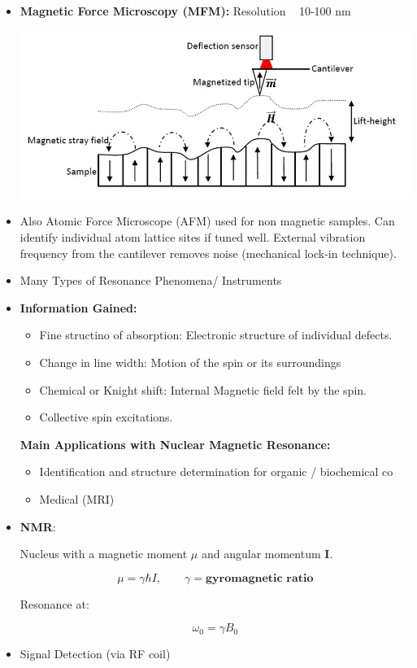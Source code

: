 \begin{itemize}
    \item \textbf{Magnetic Force Microscopy (MFM):} Resolution ~ 10-100 nm
    
    \includegraphics[width = 0.9\linewidth]{Images/MFM.jpeg}
    
    \item Also Atomic Force Microscope (AFM) used for non magnetic samples. Can identify individual atom lattice sites if tuned well. External vibration frequency from the cantilever removes noise (mechanical lock-in technique).
    
    \item Many Types of Resonance Phenomena/ Instruments
    
    \item \textbf{Information Gained:}
    \begin{itemize}
        \item Fine structino of absorption: Electronic structure of individual defects.
        \item Change in line width: Motion of the spin or its surroundings
        \item Chemical or Knight shift: Internal Magnetic field felt by the spin.
        \item Collective spin excitations.
    \end{itemize}
    
    \textbf{Main Applications with Nuclear Magnetic Resonance:} 
    \begin{itemize}
        \item Identification and structure determination for organic / biochemical co
        \item Medical (MRI)
    \end{itemize}
    
    \item \textbf{NMR}:
    
    Nucleus with a magnetic moment \textbf{$\mu$} and angular momentum \textbf{I}.
    
    \[\mu = \gamma \hbar I, \qquad \gamma = \textbf{gyromagnetic ratio} \]
    
    Resonance at:
    
    \[\omega_0 = \gamma B_0 \]
    
    \item Signal Detection (via RF coil)
\end{itemize}
